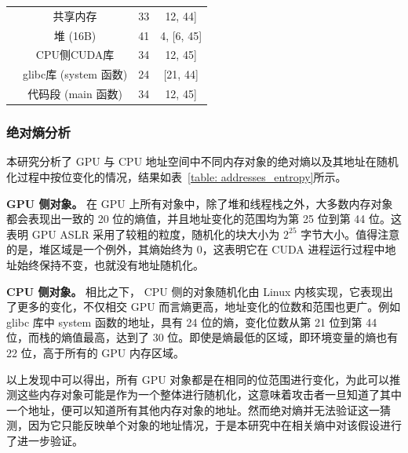 \begin{table}[t]
\begin{tabular}{cccc}
\multicolumn{1}{c|}{}                     &  \cellcolor[HTML]{EFEFEF}共享内存    &  \cellcolor[HTML]{EFEFEF}33                    &  \cellcolor[HTML]{EFEFEF}{[}12, 44{]}                    \\
\multicolumn{1}{c|}{}                     & 堆 (16B)        & 41                     & 4, {[}6, 45{]}                  \\
\multicolumn{1}{c|}{}                     &  \cellcolor[HTML]{EFEFEF}CPU侧CUDA库    &  \cellcolor[HTML]{EFEFEF}34                     &  \cellcolor[HTML]{EFEFEF}{[}12, 45{]}                    \\
\multicolumn{1}{c|}{}                     & glibc库 (system 函数)    & 24                     & {[}21, 44{]}                    \\
\multicolumn{1}{c|}{}                     &  \cellcolor[HTML]{EFEFEF}代码段 (main 函数)     &  \cellcolor[HTML]{EFEFEF}34                     &  \cellcolor[HTML]{EFEFEF}{[}12, 45{]}                    \\ 
\hline
\end{tabular}
\end{table}

\subsubsection{绝对熵分析}
本研究分析了 GPU 与 CPU 地址空间中不同内存对象的绝对熵以及其地址在随机化过程中按位变化的情况，结果如表~\ref{table: addresses_entropy}所示。

\textbf{GPU 侧对象。}
在 GPU 上所有对象中，除了堆和线程栈之外，大多数内存对象都会表现出一致的 20 位的熵值，并且地址变化的范围均为第 25 位到第 44 位。这表明 GPU ASLR 采用了较粗的粒度，随机化的块大小为  $2^{25}$ 字节大小。值得注意的是，堆区域是一个例外，其熵始终为 0，这表明它在 CUDA 进程运行过程中地址始终保持不变，也就没有地址随机化。

\textbf{CPU 侧对象。}
相比之下， CPU 侧的对象随机化由 Linux 内核实现，它表现出了更多的变化，不仅相交 GPU 而言熵更高，地址变化的位数和范围也更广。例如 glibc 库中 system 函数的地址，具有 24 位的熵，变化位数从第 21 位到第 44 位，而栈的熵值最高，达到了 30 位。即使是熵最低的区域，即环境变量的熵也有 22 位，高于所有的 GPU 内存区域。

以上发现中可以得出，所有 GPU 对象都是在相同的位范围进行变化，为此可以推测这些内存对象可能是作为一个整体进行随机化，这意味着攻击者一旦知道了其中一个地址，便可以知道所有其他内存对象的地址。然而绝对熵并无法验证这一猜测，因为它只能反映单个对象的地址情况，于是本研究中在相关熵中对该假设进行了进一步验证。

